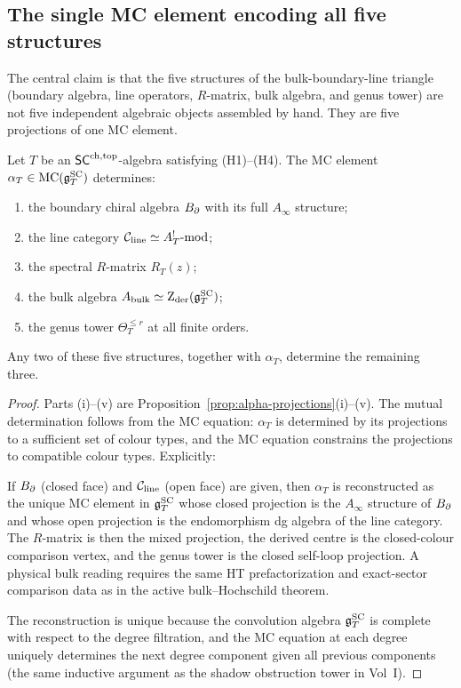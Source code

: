 \subsection{The single MC element encoding all five structures}

The central claim is that the five structures of the
bulk-boundary-line triangle (boundary algebra, line operators,
$R$-matrix, bulk algebra, and genus tower) are not five independent
algebraic objects assembled by hand. They are five projections of
one MC element.

\begin{theorem}
Let $T$ be an $\mathsf{SC}^{\mathrm{ch,top}}$-algebra satisfying \textup{(H1)--(H4)}.
The MC element $\alpha_T\in\operatorname{MC}(\mathfrak{g}^{\mathrm{SC}}_T)$ determines:
\begin{enumerate}[label=\textup{(\roman*)}]
\item the boundary chiral algebra $B_{\partial}$ with its full
$A_\infty$ structure;
\item the line category $\mathcal C_{\mathrm{line}}\simeq A^!_T\text{-mod}$;
\item the spectral $R$-matrix $R_T(z)$;
\item the bulk algebra $A_{\mathrm{bulk}}\simeq\operatorname{Z}_{\mathrm{der}}(\mathfrak{g}^{\mathrm{SC}}_T)$;
\item the genus tower $\Theta_T^{\le r}$ at all finite orders.
\end{enumerate}
Any two of these five structures, together with
$\alpha_T$, determine the remaining three.
\end{theorem}

\begin{proof}
Parts (i)--(v) are Proposition~\ref{prop:alpha-projections}(i)--(v).
The mutual determination follows from the MC equation: $\alpha_T$
is determined by its projections to a sufficient set of colour
types, and the MC equation constrains the projections to
compatible colour types. Explicitly:

If $B_{\partial}$ (closed face) and $\mathcal C_{\mathrm{line}}$ (open face)
are given, then $\alpha_T$ is reconstructed as the unique MC
element in $\mathfrak{g}^{\mathrm{SC}}_T$ whose closed projection is the $A_\infty$
structure of $B_{\partial}$ and whose open projection is the
endomorphism dg algebra of the line category. The $R$-matrix is
then the mixed projection, the derived centre is the closed-colour
comparison vertex, and the genus tower is the closed self-loop
projection. A physical bulk reading requires the same HT
prefactorization and exact-sector comparison data as in the active
bulk--Hochschild theorem.

The reconstruction is unique because the convolution algebra
$\mathfrak{g}^{\mathrm{SC}}_T$ is complete with respect to the degree filtration, and the
MC equation at each degree uniquely determines the next degree
component given all previous components (the same inductive argument
as the shadow obstruction tower in Vol~I).
\end{proof}



